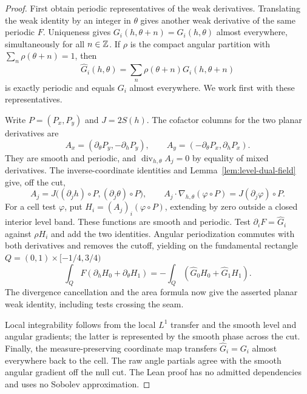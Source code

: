 \begin{proof}
\leanok
First obtain periodic representatives of the weak derivatives.
Translating the weak identity by an integer in $\theta$ gives another weak
derivative of the same periodic $F$. Uniqueness gives
$G_i(h,\theta+n)=G_i(h,\theta)$ almost everywhere, simultaneously for all
$n\in\mathbb{Z}$. If $\rho$ is the compact angular partition with
$\sum_n\rho(\theta+n)=1$, then
\[
  \widehat G_i(h,\theta)=\sum_n\rho(\theta+n)G_i(h,\theta+n)
\]
is exactly periodic and equals $G_i$ almost everywhere. We work first with
these representatives.

Write $P=(P_x,P_y)$ and $J=2S(h)$. The cofactor columns for the two
planar derivatives are
\[
  A_x=(\partial_\theta P_y,-\partial_hP_y),\qquad
  A_y=(-\partial_\theta P_x,\partial_hP_x).
\]
They are smooth and periodic, and $\operatorname{div}_{h,\theta}A_j=0$
by equality of mixed derivatives. The inverse-coordinate identities and
Lemma~\ref{lem:level-dual-field} give, off the cut,
\[
  A_j=J\bigl((\partial_jh)\circ P,(\partial_j\theta)\circ P\bigr),
  \qquad A_j\cdot\nabla_{h,\theta}(\varphi\circ P)
    =J(\partial_j\varphi)\circ P.
\]
For a cell test $\varphi$, put $H_i=(A_j)_i(\varphi\circ P)$,
extending by zero outside a closed interior level band. These functions
are smooth and periodic. Test $\partial_iF=\widehat G_i$ against
$\rho H_i$ and add the two identities. Angular periodization commutes
with both derivatives and removes the cutoff, yielding on the fundamental
rectangle $Q=(0,1)\times[-1/4,3/4)$
\[
  \int_Q F(\partial_hH_0+\partial_\theta H_1)
    =-\int_Q(\widehat G_0H_0+\widehat G_1H_1).
\]
The divergence cancellation and the area formula now give the asserted
planar weak identity, including tests crossing the seam.

Local integrability follows from the local $L^1$ transfer and the smooth
level and angular gradients; the latter is represented by the smooth phase
across the cut. Finally, the measure-preserving coordinate map transfers
$\widehat G_i=G_i$ almost everywhere back to the cell. The raw angle
partials agree with the smooth angular gradient off the null cut.
The Lean proof has no admitted dependencies and uses no Sobolev approximation.
\end{proof}

